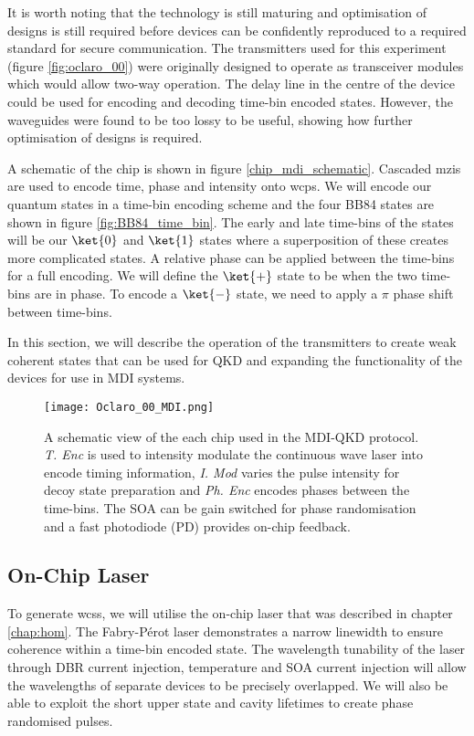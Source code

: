 It is worth noting that the technology is still maturing and optimisation of designs is still required before devices can be confidently reproduced to a required standard for secure communication. The transmitters used for this experiment (figure \ref{fig:oclaro_00}) were originally designed to operate as transceiver modules which would allow two-way operation. The delay line in the centre of the device could be used for encoding and decoding time-bin encoded states. However, the waveguides were found to be too lossy to be useful, showing how further optimisation of designs is required.

A schematic of the chip is shown in figure \ref{chip_mdi_schematic}. Cascaded \acp{mzi} are used to encode time, phase and intensity onto \acp{wcp}.  We will encode our quantum states in a time-bin encoding scheme and the four BB84 states are shown in figure \ref{fig:BB84_time_bin}. The early and late time-bins of the states will be our $\ket{0}$ and $\ket{1}$ states where a superposition of these creates more complicated states. A relative phase can be applied between the time-bins for a full encoding. We will define the $\ket{+}$ state to be when the two time-bins are in phase. To encode a $\ket{-}$ state, we need to apply a $\pi$ phase shift between time-bins. 

In this section, we will describe the operation of the transmitters to create weak coherent states that can be used for \acl{QKD} and expanding the functionality of the devices for use in \ac{MDI} systems.

\begin{figure}[tbp]
	\texttt{[image: Oclaro\_00\_MDI.png]}
	\caption[InP transmitter schematic]{A schematic view of the each chip used in the MDI-QKD protocol. \textit{T. Enc} is used to intensity modulate the continuous wave laser into encode timing information, \textit{I. Mod} varies the pulse intensity for decoy state preparation and \textit{Ph. Enc} encodes phases between the time-bins. The SOA can be gain switched for phase randomisation and a fast photodiode (PD) provides on-chip feedback.}
	\label{fig:chip_mdi_schematic}
\end{figure}

\subsection{On-Chip Laser}

To generate \acp{wcs}, we will utilise the on-chip laser that was described in chapter \ref{chap:hom}. The Fabry-P\'{e}rot laser demonstrates a narrow linewidth to ensure coherence within a time-bin encoded state. The wavelength tunability of the laser through \ac{DBR} current injection, temperature and \ac{SOA} current injection will allow the wavelengths of separate devices to be precisely overlapped. We will also be able to exploit the short upper state and cavity lifetimes to create phase randomised pulses.

